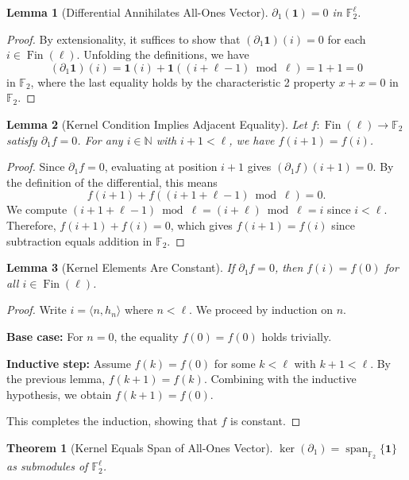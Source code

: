 \documentclass[11pt]{article}
\theoremstyle{plain}
\newtheorem*{theorem}{Theorem}
\newtheorem*{lemma}{Lemma}
\theoremstyle{definition}
\theoremstyle{remark}
\renewcommand{\ker}{\operatorname{ker}}
\begin{document}
\begin{lemma}[Differential Annihilates All-Ones Vector]
$\partial_1(\mathbf{1}) = 0$ in $\mathbb{F}_2^\ell$.
\end{lemma}

\begin{proof}
By extensionality, it suffices to show that $(\partial_1 \mathbf{1})(i) = 0$ for each $i \in \operatorname{Fin}(\ell)$. Unfolding the definitions, we have
\[
(\partial_1 \mathbf{1})(i) = \mathbf{1}(i) + \mathbf{1}((i+\ell-1)\bmod\ell) = 1 + 1 = 0
\]
in $\mathbb{F}_2$, where the last equality holds by the characteristic 2 property $x + x = 0$ in $\mathbb{F}_2$.
\end{proof}

\begin{lemma}[Kernel Condition Implies Adjacent Equality]
Let $f : \operatorname{Fin}(\ell) \to \mathbb{F}_2$ satisfy $\partial_1 f = 0$. For any $i \in \mathbb{N}$ with $i + 1 < \ell$, we have $f(i+1) = f(i)$.
\end{lemma}

\begin{proof}
Since $\partial_1 f = 0$, evaluating at position $i+1$ gives $(\partial_1 f)(i+1) = 0$. By the definition of the differential, this means
\[
f(i+1) + f\!\left((i+1+\ell-1)\bmod\ell\right) = 0.
\]
We compute $(i+1+\ell-1)\bmod\ell = (i+\ell)\bmod\ell = i$ since $i < \ell$. Therefore, $f(i+1) + f(i) = 0$, which gives $f(i+1) = f(i)$ since subtraction equals addition in $\mathbb{F}_2$.
\end{proof}

\begin{lemma}[Kernel Elements Are Constant]
If $\partial_1 f = 0$, then $f(i) = f(0)$ for all $i \in \operatorname{Fin}(\ell)$.
\end{lemma}

\begin{proof}
Write $i = \langle n, h_n \rangle$ where $n < \ell$. We proceed by induction on $n$. 

\textbf{Base case:} For $n = 0$, the equality $f(0) = f(0)$ holds trivially.

\textbf{Inductive step:} Assume $f(k) = f(0)$ for some $k < \ell$ with $k + 1 < \ell$. By the previous lemma, $f(k+1) = f(k)$. Combining with the inductive hypothesis, we obtain $f(k+1) = f(0)$.

This completes the induction, showing that $f$ is constant.
\end{proof}

\begin{theorem}[Kernel Equals Span of All-Ones Vector]
$\ker(\partial_1) = \operatorname{span}_{\mathbb{F}_2}\{\mathbf{1}\}$ as submodules of $\mathbb{F}_2^\ell$.
\end{theorem}
\end{document}
